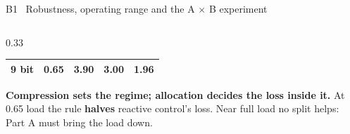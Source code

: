 \documentclass[aspectratio=169,10pt,xcolor={table,dvipsnames}]{beamer}
\newcommand{\gd}[1]{\textcolor{good}{\textbf{#1}}}
\begin{document}
\begin{frame}{B1 \textbullet\ Robustness, operating range and the A $\times$ B experiment}
\begin{columns}[T]
\begin{column}{0.33\textwidth}
\begin{tabular}{lcccc}
9 bit & 0.65 & 3.90 & 3.00 & \gd{1.96} \\
\bottomrule
\end{tabular}
\vspace{0.4em}
\begin{tcolorbox}[enhanced,colback=good!8,colframe=good,boxrule=0.5pt,arc=2pt,left=3pt,right=3pt]
\scriptsize \textbf{Compression sets the regime; allocation decides the loss inside it.} At 0.65 load the rule \textbf{halves} reactive control's loss. Near full load no split helps: Part A must bring the load down.
\end{tcolorbox}
\end{column}
\end{columns}
\end{frame}

\end{document}
